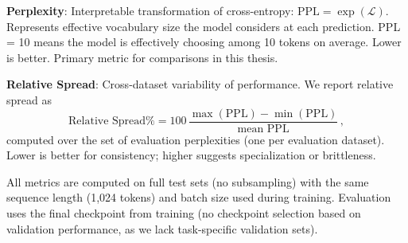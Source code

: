 \textbf{Perplexity}: Interpretable transformation of cross-entropy: $\text{PPL} = \exp(\mathcal{L})$. Represents effective vocabulary size the model considers at each prediction. PPL = 10 means the model is effectively choosing among 10 tokens on average. Lower is better. Primary metric for comparisons in this thesis.

\textbf{Relative Spread}: Cross-dataset variability of performance. We report relative spread as
\begin{equation*}
    \text{Relative Spread}\% = 100\,\frac{\max(\text{PPL}) - \min(\text{PPL})}{\text{mean PPL}}\, ,
\end{equation*}
computed over the set of evaluation perplexities (one per evaluation dataset). Lower is better for consistency; higher suggests specialization or brittleness.

All metrics are computed on full test sets (no subsampling) with the same sequence length (1,024 tokens) and batch size used during training. Evaluation uses the final checkpoint from training (no checkpoint selection based on validation performance, as we lack task-specific validation sets).
